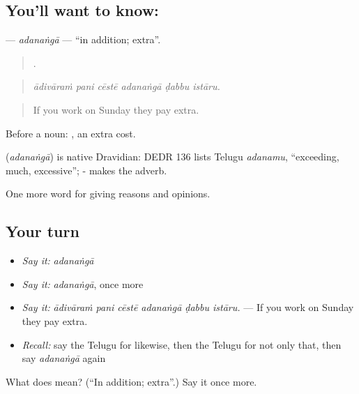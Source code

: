 \subsection*{You'll want to know: }
\textbf{} — \emph{adanaṅgā} — \textquotedblleft{}in addition; extra\textquotedblright{}.

\begin{quote}
     .
\end{quote}

\begin{quote}
\emph{ādivāraṁ pani cēstē adanaṅgā ḍabbu istāru.}
\end{quote}

\begin{quote}
If you work on Sunday they pay extra.
\end{quote}

Before a noun:  , an extra cost.

\begin{cousinweb}
\textbf{} (\emph{adanaṅgā}) is native Dravidian: DEDR 136 lists Telugu \emph{adanamu}, \textquotedblleft{}exceeding, much, excessive\textquotedblright{}; - makes the adverb.
\end{cousinweb}

\begin{grammarlens}[title={What you've built}]
One more word for giving reasons and opinions.
\end{grammarlens}

\subsection*{Your turn}
\begin{itemize}
\raggedright
  \item \emph{Say it:} \emph{adanaṅgā}
  \item \emph{Say it:} \emph{adanaṅgā}, once more
  \item \emph{Say it:} \emph{ādivāraṁ pani cēstē adanaṅgā ḍabbu istāru.} — If you work on Sunday they pay extra.
  \item \emph{Recall:} say the Telugu for likewise, then the Telugu for not only that, then say \emph{adanaṅgā} again
\end{itemize}

\begin{tcolorbox}[breakable,colback=teal!4,colframe=teal!35!black,title={Before you move on}]
What does  mean? (\textquotedblleft{}In addition; extra\textquotedblright{}.) Say it once more.
\end{tcolorbox}
